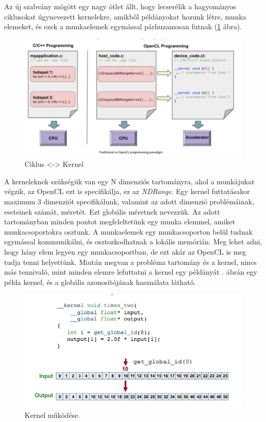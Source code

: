 Az új szabvány mögött egy nagy ötlet állt, hogy lecserélik a hagyományos ciklusokat úgynevezett kernelekre, amikből példányokat hozunk létre, munka elemeket, és ezek a munkaelemek egymással párhuzamosan futnak (\ref{fig:loopVsKernel} ábra).

\begin{figure}[h]
\centering
\includegraphics[scale=0.4]{images/loopvskernel.jpg}
\caption{Ciklus <-> Kernel \cite{opencl}}
\label{fig:loopVsKernel}
\end{figure}

A kerneleknek szükségük van egy N dimenziós tartományra, ahol a munkájukat végzik, az OpenCL  ezt is specifikálja, ez az \textit{NDRange}. Egy kernel futtatásakor maximum 3 dimenziót specifikálunk, valamint az adott dimenzió problémáinak, eseteinek számát, méretét. Ezt globális méretnek nevezzük. Az adott tartományban minden pontot megfeleltetünk egy munka elemmel, amiket munkacsoportokra osztunk. A munkaelemek egy munkacsoporton belül tudnak egymással kommunikálni, és osztozkodhatnak a lokális memórián. Meg lehet adni, hogy hány elem legyen egy munkacsoportban, de ezt akár az OpenCL is meg tudja tenni helyettünk. Miután megvan a probléma tartomány és a  kernel, nincs más tennivaló, mint minden elemre lefuttatni a kernel egy példányát \cite{opencl_origin_range}.  ábrán egy példa kernel, és a globális azonosítójának használata látható.
 
\begin{figure}[h]
\centering
\includegraphics[scale=0.7]{images/kernel.jpg}
\caption{Kernel működése. \cite{opencl_origink}}
\label{fig:kernel}
\end{figure}

